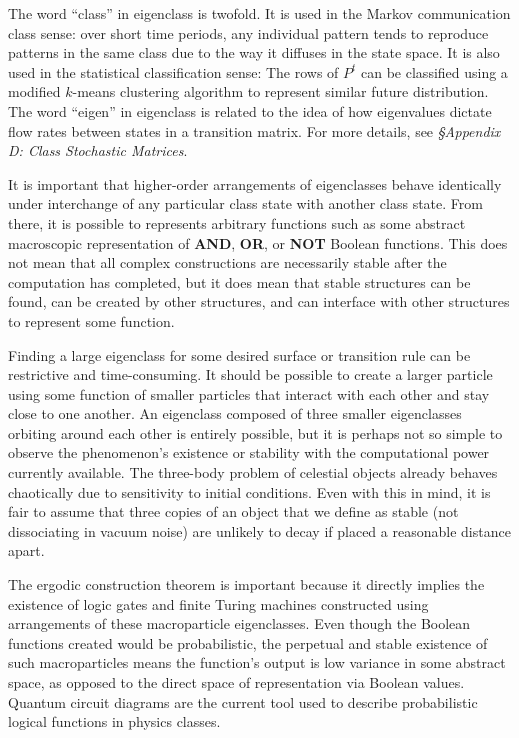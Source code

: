 \documentclass[10pt, a5paper, twoside, openright]{memoir}
\begin{document}
The word ``class'' in eigenclass is twofold. It is used in the Markov communication class sense: over short time periods, any individual pattern tends to reproduce patterns in the same class due to the way it diffuses in the state space. It is also used in the statistical classification sense: The rows of $P^t$ can be classified using a modified $k$-means clustering algorithm to represent similar future distribution. The word ``eigen'' in eigenclass is related to the idea of how eigenvalues dictate flow rates between states in a transition matrix. For more details, see \textit{\S Appendix D: Class Stochastic Matrices}.

It is important that higher-order arrangements of eigenclasses behave identically under interchange of any particular class state with another class state. From there, it is possible to represents arbitrary functions such as some abstract macroscopic representation of \textbf{AND}, \textbf{OR}, or \textbf{NOT} Boolean functions. This does not mean that all complex constructions are necessarily stable after the computation has completed, but it does mean that stable structures can be found, can be created by other structures, and can interface with other structures to represent some function.

Finding a large eigenclass for some desired surface or transition rule can be restrictive and time-consuming. It should be possible to create a larger particle using some function of smaller particles that interact with each other and stay close to one another. An eigenclass composed of three smaller eigenclasses orbiting around each other is entirely possible, but it is perhaps not so simple to observe the phenomenon's existence or stability with the computational power currently available. The three-body problem of celestial objects already behaves chaotically due to sensitivity to initial conditions. Even with this in mind, it is fair to assume that three copies of an object that we define as stable (not dissociating in vacuum noise) are unlikely to decay if placed a reasonable distance apart.

The ergodic construction theorem is important because it directly implies the existence of logic gates and finite Turing machines constructed using arrangements of these macroparticle eigenclasses. Even though the Boolean functions created would be probabilistic, the perpetual and stable existence of such macroparticles means the function's output is low variance in some abstract space, as opposed to the direct space of representation via Boolean values. Quantum circuit diagrams are the current tool used to describe probabilistic logical functions in physics classes.
\end{document}

